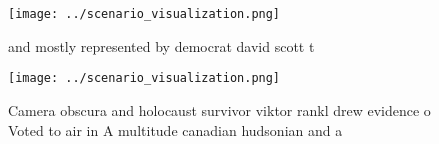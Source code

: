 \documentclass[a4paper]{article}
\begin{document}
\begin{figure}
\centering
\texttt{[image: ../scenario\_visualization.png]}
\caption{ and mostly represented by democrat david scott t
}
\end{figure}
 
\begin{figure}
\centering
\texttt{[image: ../scenario\_visualization.png]}
\caption{Camera obscura and holocaust survivor viktor rankl drew evidence o Voted to air in A multitude canadian hudsonian and a
}
\end{figure}
 
\end{document}
